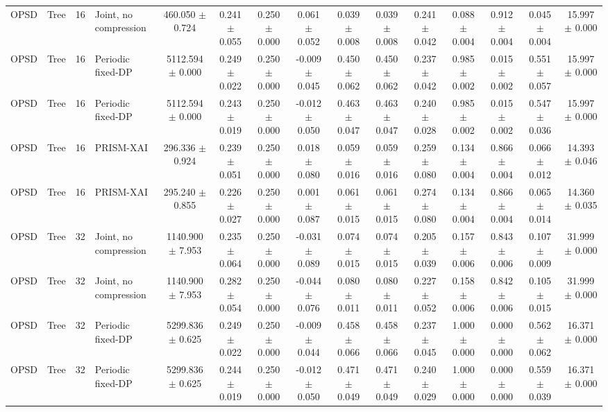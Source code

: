 \begin{table}[t]
\begin{tabular}{llllccccccccccc}
OPSD & Tree & 16 & Joint, no compression & 460.050 $\pm$ 0.724 & 0.241 $\pm$ 0.055 & 0.250 $\pm$ 0.000 & 0.061 $\pm$ 0.052 & 0.039 $\pm$ 0.008 & 0.039 $\pm$ 0.008 & 0.241 $\pm$ 0.042 & 0.088 $\pm$ 0.004 & 0.912 $\pm$ 0.004 & 0.045 $\pm$ 0.004 & 15.997 $\pm$ 0.000 \\
OPSD & Tree & 16 & Periodic fixed-DP & 5112.594 $\pm$ 0.000 & 0.249 $\pm$ 0.022 & 0.250 $\pm$ 0.000 & -0.009 $\pm$ 0.045 & 0.450 $\pm$ 0.062 & 0.450 $\pm$ 0.062 & 0.237 $\pm$ 0.042 & 0.985 $\pm$ 0.002 & 0.015 $\pm$ 0.002 & 0.551 $\pm$ 0.057 & 15.997 $\pm$ 0.000 \\
OPSD & Tree & 16 & Periodic fixed-DP & 5112.594 $\pm$ 0.000 & 0.243 $\pm$ 0.019 & 0.250 $\pm$ 0.000 & -0.012 $\pm$ 0.050 & 0.463 $\pm$ 0.047 & 0.463 $\pm$ 0.047 & 0.240 $\pm$ 0.028 & 0.985 $\pm$ 0.002 & 0.015 $\pm$ 0.002 & 0.547 $\pm$ 0.036 & 15.997 $\pm$ 0.000 \\
OPSD & Tree & 16 & PRISM-XAI & 296.336 $\pm$ 0.924 & 0.239 $\pm$ 0.051 & 0.250 $\pm$ 0.000 & 0.018 $\pm$ 0.080 & 0.059 $\pm$ 0.016 & 0.059 $\pm$ 0.016 & 0.259 $\pm$ 0.080 & 0.134 $\pm$ 0.004 & 0.866 $\pm$ 0.004 & 0.066 $\pm$ 0.012 & 14.393 $\pm$ 0.046 \\
OPSD & Tree & 16 & PRISM-XAI & 295.240 $\pm$ 0.855 & 0.226 $\pm$ 0.027 & 0.250 $\pm$ 0.000 & 0.001 $\pm$ 0.087 & 0.061 $\pm$ 0.015 & 0.061 $\pm$ 0.015 & 0.274 $\pm$ 0.080 & 0.134 $\pm$ 0.004 & 0.866 $\pm$ 0.004 & 0.065 $\pm$ 0.014 & 14.360 $\pm$ 0.035 \\
OPSD & Tree & 32 & Joint, no compression & 1140.900 $\pm$ 7.953 & 0.235 $\pm$ 0.064 & 0.250 $\pm$ 0.000 & -0.031 $\pm$ 0.089 & 0.074 $\pm$ 0.015 & 0.074 $\pm$ 0.015 & 0.205 $\pm$ 0.039 & 0.157 $\pm$ 0.006 & 0.843 $\pm$ 0.006 & 0.107 $\pm$ 0.009 & 31.999 $\pm$ 0.000 \\
OPSD & Tree & 32 & Joint, no compression & 1140.900 $\pm$ 7.953 & 0.282 $\pm$ 0.054 & 0.250 $\pm$ 0.000 & -0.044 $\pm$ 0.076 & 0.080 $\pm$ 0.011 & 0.080 $\pm$ 0.011 & 0.227 $\pm$ 0.052 & 0.158 $\pm$ 0.006 & 0.842 $\pm$ 0.006 & 0.105 $\pm$ 0.015 & 31.999 $\pm$ 0.000 \\
OPSD & Tree & 32 & Periodic fixed-DP & 5299.836 $\pm$ 0.625 & 0.249 $\pm$ 0.022 & 0.250 $\pm$ 0.000 & -0.009 $\pm$ 0.044 & 0.458 $\pm$ 0.066 & 0.458 $\pm$ 0.066 & 0.237 $\pm$ 0.045 & 1.000 $\pm$ 0.000 & 0.000 $\pm$ 0.000 & 0.562 $\pm$ 0.062 & 16.371 $\pm$ 0.000 \\
OPSD & Tree & 32 & Periodic fixed-DP & 5299.836 $\pm$ 0.625 & 0.244 $\pm$ 0.019 & 0.250 $\pm$ 0.000 & -0.012 $\pm$ 0.050 & 0.471 $\pm$ 0.049 & 0.471 $\pm$ 0.049 & 0.240 $\pm$ 0.029 & 1.000 $\pm$ 0.000 & 0.000 $\pm$ 0.000 & 0.559 $\pm$ 0.039 & 16.371 $\pm$ 0.000 \\

\end{tabular}
\end{table}
